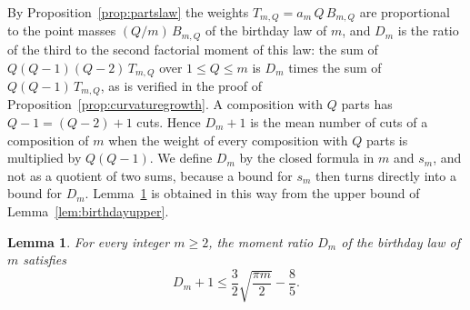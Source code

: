 \documentclass{amsart}
\newtheorem{lemma}[theorem]{Lemma}
\theoremstyle{definition}
\theoremstyle{remark}
\numberwithin{equation}{section}
\begin{document}
By Proposition~\ref{prop:partslaw} the weights
$T_{m,Q}=a_m\,Q\,B_{m,Q}$ are proportional to the point masses
$(Q/m)\,B_{m,Q}$ of the birthday law of $m$, and $D_m$ is the ratio of
the third to the second factorial moment of this law: the sum of
$Q(Q-1)(Q-2)\,T_{m,Q}$ over $1\le Q\le m$ is $D_m$ times the sum of
$Q(Q-1)\,T_{m,Q}$, as is verified in the proof of
Proposition~\ref{prop:curvaturegrowth}. A composition with $Q$ parts has
$Q-1=(Q-2)+1$ cuts. Hence
$D_m+1$ is the mean number of cuts of a composition of $m$ when the weight
of every composition with $Q$ parts is multiplied by $Q(Q-1)$. We define
$D_m$ by the closed formula
in $m$ and $s_m$, and not as a quotient of two sums, because a bound for
$s_m$ then turns directly into a bound for $D_m$.
Lemma~\ref{lem:momentquotient} is obtained in this way from the upper bound
of Lemma~\ref{lem:birthdayupper}.

\begin{lemma}\label{lem:momentquotient}
For every integer $m\ge2$, the moment ratio $D_m$ of the birthday law of
$m$ satisfies
\[
D_m+1\le\frac32\sqrt{\frac{\pi m}{2}}-\frac85 .
\]
\end{lemma}
\end{document}

